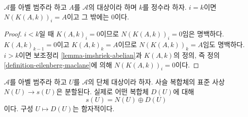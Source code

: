\begin{lemma}
\label{lemma-N-K}
$\mathcal{A}$를 아벨 범주라 하고 $A$를 $\mathcal{A}$의 대상이라 하며
$k$를 정수라 하자. $i = k$이면 $N(K(A, k))_i = A$이고 그 밖에는
$0$이다.
\end{lemma}

\begin{proof}
$i < k$일 때 $K(A, k)_i = 0$이므로 $N(K(A, k))_i = 0$임은 명백하다.
$K(A, k)_{k - 1} = 0$이고 $K(A, k)_k = A$이므로
$N(K(A, k))_k = A$임도 명백하다. $i > k$이면 보조정리
\ref{lemma-imshriek-abelian}과 $K(A, k)$의 정의, 즉 정의
\ref{definition-eilenberg-maclane}에 의해 $N(K(A, k))_i = 0$이다.
\end{proof}

\begin{lemma}
\label{lemma-decompose-associated-complexes}
$\mathcal{A}$를 아벨 범주라 하고 $U$를 $\mathcal{A}$의 단체 대상이라
하자. 사슬 복합체의 표준 사상 $N(U) \to s(U)$은 분할된다. 실제로 어떤
복합체 $D(U)$에 대해
$$
s(U) = N(U) \oplus D(U)
$$
이다. 구성 $U \mapsto D(U)$는 함자적이다.
\end{lemma}

